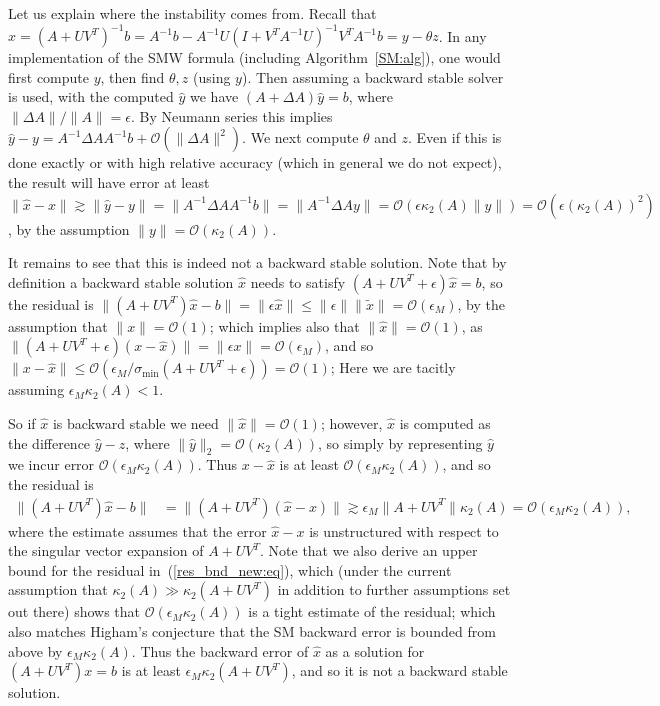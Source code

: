 \documentclass{siamltex}
\newcommand{\eqnref}[1]{(\ref{#1})}
\newcommand{\eps}{\epsilon}
\begin{document}
Let us explain where the instability comes from. 
Recall that 
$x = (A+UV^T)^{-1}b = A^{-1}b - A^{-1}U(I + V^T\!A^{-1}U)^{-1}V^T\! A^{-1}b=y-\theta z$. In any implementation of the SMW formula (including Algorithm~\ref{SM:alg}), one would first compute $y$, then find $\theta, z$ (using $y$). 
Then assuming a backward stable solver is used, with the computed $\hat y$ we have $(A+\Delta A)\hat y=b$, where $\|\Delta A\|/\|A\|=\epsilon$. By Neumann series this implies 
$\hat y - y = A^{-1}\Delta A A^{-1}b + \mathcal{O}(\|\Delta A\|^2)$. 
We next compute $\theta$ and $z$. Even if this is done exactly or with high relative accuracy (which in general we do not expect), the result will have error at least 
$
\|\hat x-x\|\gtrsim 
\|\hat y - y\| = \|A^{-1}\Delta A A^{-1}b\| =
\|A^{-1}\Delta A y\|= \mathcal{O}(\epsilon \kappa_2(A)\|y\|) = \mathcal{O}(\epsilon (\kappa_2(A))^2)$, by the assumption $\|y\| = \mathcal{O}(\kappa_2(A))$. 

It remains to see that this is indeed not a backward stable solution. 
Note that by definition a backward stable solution $\hat x$ needs to satisfy 
$(A+UV^T+\epsilon)\hat x = b$, so the residual is 
$\|(A+UV^T)\hat x -b\| = \|\epsilon\hat x\|
\leq  \|\epsilon\| \|\tilde x\|= \mathcal{O}(\eps_M)$, by the assumption that $\|x\|=\mathcal{O}(1)$; which implies  also that $\|\hat x\|=\mathcal{O}(1)$, as $\|(A+UV^T+\epsilon)(x-\hat x)\|= \|\epsilon x\| = \mathcal{O}(\eps_M)$, and so $\|x-\hat x\|\leq \mathcal{O}(\eps_M/\sigma_{\min}(A+UV^T+\epsilon))=\mathcal{O}(1)$; Here we are tacitly assuming $\eps_M\kappa_2(A)<1$.

So if $\hat x$ is backward stable we need $\|\hat x\|=\mathcal{O}(1)$; however, $\hat x$ is computed as the difference $\hat y-\hat z$, where $\|\hat y\|_2=\mathcal{O}(\kappa_2(A))$, so simply by representing $\hat y$ we incur error $\mathcal{O}(\eps_M\kappa_2(A))$. 
Thus $x-\hat x$ is at least $\mathcal{O}(\eps_M\kappa_2(A))$, and so the residual is 
\begin{align*}
\|(A+UV^T)\hat x-b\| &= 
\|(A+UV^T)(\hat x-x)\|
\gtrsim \eps_M\|A+UV^T\|\kappa_2(A)
=\mathcal{O}(\eps_M\kappa_2(A)), 
\end{align*}
where the estimate assumes that the error $\hat x-x$ is unstructured with respect to the singular vector expansion of $A+UV^T$. Note that we also derive an upper bound for the residual in~\eqnref{res_bnd_new:eq}, which (under the current assumption that $\kappa_2(A)\gg \kappa_2(A+UV^T)$ in addition to further assumptions set out there) shows that $\mathcal{O}(\eps_M\kappa_2(A))$ is a tight estimate of the residual; which also matches Higham's conjecture that the SM backward error is bounded from above by $\eps_M \kappa_2(A)$. Thus the backward error of $\hat x$  as a solution for $(A+UV^T)x=b$ is at least $\eps_M\kappa_2(A+UV^T)$, and so it is not a backward stable solution. 
\end{document}
